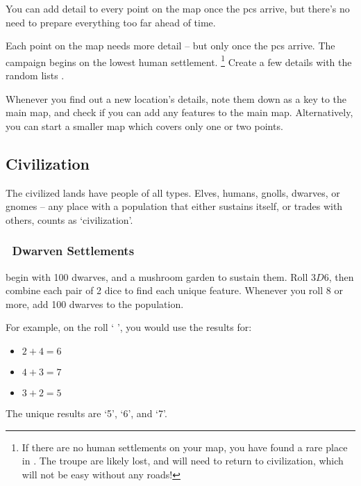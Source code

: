 \begin{multicols}{2}

\noindent
You can add detail to every point on the map once the \glspl{pc} arrive, but there's no need to prepare everything too far ahead of time.

Each point on the map needs more detail -- but only once the \glspl{pc} arrive.
The \gls{campaign} begins on the lowest human settlement.%
\footnote{If there are no human settlements on your map, you have found a rare place in .
The troupe are likely lost, and will need to return to civilization, which will not be easy without any roads!}
Create a few details with the random lists .

Whenever you find out a new location's details, note them down as a key to the main map, and check if you can add any features to the main map.
Alternatively, you can start a smaller map which covers only one or two points.

\subsection{Civilization}

The civilized lands have people of all types.
Elves, humans, gnolls, dwarves, or gnomes -- any place with a population that either sustains itself, or trades with others, counts as `civilization'.

\subsubsection[Dwarven Settlements]{\Dw\ Dwarven Settlements}
\label{dwarvenPoint}
begin with 100 dwarves, and a mushroom garden to sustain them.
Roll $3D6$, then combine each pair of 2 dice to find each unique feature.
Whenever you roll 8 or more, add 100 dwarves to the population.

\begin{exampletext}
  For example, on the roll `  ', you would use the results for:

  \begin{itemize}
    \item
    $2+4 = 6$
    \item
    $4+3 = 7$
    \item
    $3+2 = 5$
  \end{itemize}

  The unique results are `5', `6', and `7'.


\end{exampletext}
\end{multicols}
